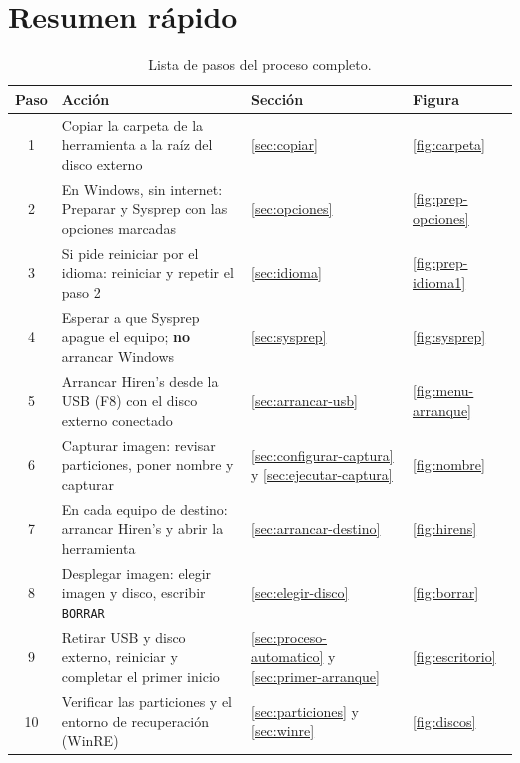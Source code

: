 \documentclass[11pt,a4paper]{report}
\begin{document}
\chapter{Resumen rápido}

\begin{table}[H]
  \centering
  \small
  \begin{tabularx}{\textwidth}{@{}c X l l@{}}
    \toprule
    \textbf{Paso} & \textbf{Acción} & \textbf{Sección} & \textbf{Figura} \\
    \midrule
    1 & Copiar la carpeta de la herramienta a la raíz del disco externo & \ref{sec:copiar} & \ref{fig:carpeta} \\
    2 & En Windows, sin internet: \textsf{Preparar y Sysprep} con las opciones marcadas & \ref{sec:opciones} & \ref{fig:prep-opciones} \\
    3 & Si pide reiniciar por el idioma: reiniciar y repetir el paso 2 & \ref{sec:idioma} & \ref{fig:prep-idioma1} \\
    4 & Esperar a que Sysprep apague el equipo; \textbf{no} arrancar Windows & \ref{sec:sysprep} & \ref{fig:sysprep} \\
    5 & Arrancar Hiren's desde la USB (\textsf{F8}) con el disco externo conectado & \ref{sec:arrancar-usb} & \ref{fig:menu-arranque} \\
    6 & \textsf{Capturar imagen}: revisar particiones, poner nombre y capturar & \ref{sec:configurar-captura} y \ref{sec:ejecutar-captura} & \ref{fig:nombre} \\
    7 & En cada equipo de destino: arrancar Hiren's y abrir la herramienta & \ref{sec:arrancar-destino} & \ref{fig:hirens} \\
    8 & \textsf{Desplegar imagen}: elegir imagen y disco, escribir \texttt{BORRAR} & \ref{sec:elegir-disco} & \ref{fig:borrar} \\
    9 & Retirar USB y disco externo, reiniciar y completar el primer inicio & \ref{sec:proceso-automatico} y \ref{sec:primer-arranque} & \ref{fig:escritorio} \\
    10 & Verificar las particiones y el entorno de recuperación (WinRE) & \ref{sec:particiones} y \ref{sec:winre} & \ref{fig:discos} \\
    \bottomrule
  \end{tabularx}
  \caption{Lista de pasos del proceso completo.}
\end{table}
\end{document}
